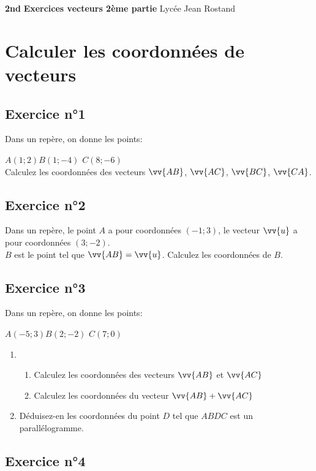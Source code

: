 \documentclass[12pt,a4paper]{article}
\begin{document}
\textbf{2nd} \hfill \textbf{Exercices vecteurs 2ème partie} \hfill Lycée Jean Rostand\\
\trait 

\section{Calculer les coordonnées de vecteurs}
\subsection*{Exercice n°1}

Dans un repère, on donne les points:

$A(1;2)$\qquad $B(1;-4)$ \qquad $C(8;-6)$\\
Calculez les coordonnées des vecteurs $\vv{AB}$, $\vv{AC}$, $\vv{BC}$, $\vv{CA}$.

\subsection*{Exercice n°2}

Dans un repère, le point $A$ a pour coordonnées $(-1;3)$, le vecteur $\vv{u}$ a pour coordonnées $(3;-2)$.\\
$B$ est le point tel que $\vv{AB}=\vv{u}$.
Calculez les coordonnées de $B$.

\subsection*{Exercice n°3}

Dans un repère, on donne les points:

$A(-5;3)$\qquad $B(2;-2)$ \qquad $C(7;0)$

\begin{enumerate}
    \item 
    \begin{enumerate}
        \item Calculez les coordonnées des vecteurs $\vv{AB}$ et $\vv{AC}$
        \item Calculez les coordonnées du vecteur $\vv{AB}+\vv{AC}$
    \end{enumerate}
    \item Déduisez-en les coordonnées du point $D$ tel que $ABDC$ est un parallélogramme.
\end{enumerate}

\subsection*{Exercice n°4}
\end{document}
